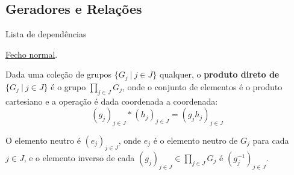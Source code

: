 \subsection{Geradores e Relações}
\label{geradores-relacoes-def}
\begin{titlemize}{Lista de dependências}
	\item \hyperref[fecho-normal-def]{Fecho normal}.%
\end{titlemize}

\newcommand{\Ast}{\mathop{\scalebox{1.5}{\raisebox{-0.2ex}{$\ast$}}}}

\begin{defi}
    Dada uma coleção de grupos $\{G_j~|~j\in J\}$ qualquer, o \textbf{produto direto de $\{G_j~|~j\in J\}$} é o grupo $\prod_{j\in J} G_j$, onde o conjunto de elementos é o produto cartesiano e a operação é dada coordenada a coordenada:
    \[(g_j)_{j\in J} * (h_j)_{j\in J} = (g_j h_j)_{j\in J}\]

    O elemento neutro é $(e_j)_{j\in J}$, onde $e_j$ é o elemento neutro de $G_j$ para cada $j\in J$, e o elemento inverso de cada $(g_j)_{j\in J} \in \prod_{j\in J} G_j$ é $(g_j^{-1})_{j\in J}$.
\end{defi}

